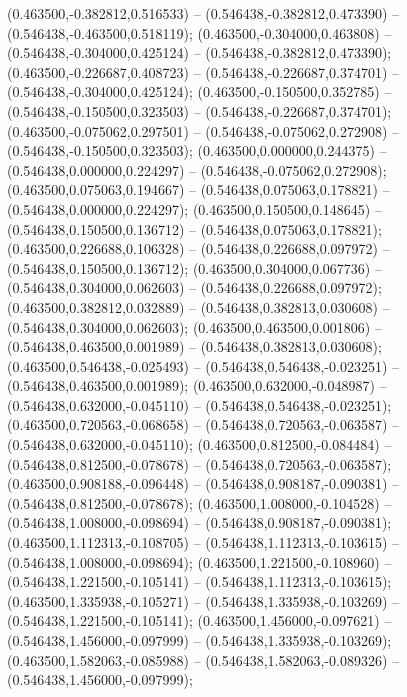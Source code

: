  (0.463500,-0.382812,0.516533) -- (0.546438,-0.382812,0.473390) -- (0.546438,-0.463500,0.518119);
 (0.463500,-0.304000,0.463808) -- (0.546438,-0.304000,0.425124) -- (0.546438,-0.382812,0.473390);
 (0.463500,-0.226687,0.408723) -- (0.546438,-0.226687,0.374701) -- (0.546438,-0.304000,0.425124);
 (0.463500,-0.150500,0.352785) -- (0.546438,-0.150500,0.323503) -- (0.546438,-0.226687,0.374701);
 (0.463500,-0.075062,0.297501) -- (0.546438,-0.075062,0.272908) -- (0.546438,-0.150500,0.323503);
 (0.463500,0.000000,0.244375) -- (0.546438,0.000000,0.224297) -- (0.546438,-0.075062,0.272908);
 (0.463500,0.075063,0.194667) -- (0.546438,0.075063,0.178821) -- (0.546438,0.000000,0.224297);
 (0.463500,0.150500,0.148645) -- (0.546438,0.150500,0.136712) -- (0.546438,0.075063,0.178821);
 (0.463500,0.226688,0.106328) -- (0.546438,0.226688,0.097972) -- (0.546438,0.150500,0.136712);
 (0.463500,0.304000,0.067736) -- (0.546438,0.304000,0.062603) -- (0.546438,0.226688,0.097972);
 (0.463500,0.382812,0.032889) -- (0.546438,0.382813,0.030608) -- (0.546438,0.304000,0.062603);
 (0.463500,0.463500,0.001806) -- (0.546438,0.463500,0.001989) -- (0.546438,0.382813,0.030608);
 (0.463500,0.546438,-0.025493) -- (0.546438,0.546438,-0.023251) -- (0.546438,0.463500,0.001989);
 (0.463500,0.632000,-0.048987) -- (0.546438,0.632000,-0.045110) -- (0.546438,0.546438,-0.023251);
 (0.463500,0.720563,-0.068658) -- (0.546438,0.720563,-0.063587) -- (0.546438,0.632000,-0.045110);
 (0.463500,0.812500,-0.084484) -- (0.546438,0.812500,-0.078678) -- (0.546438,0.720563,-0.063587);
 (0.463500,0.908188,-0.096448) -- (0.546438,0.908187,-0.090381) -- (0.546438,0.812500,-0.078678);
 (0.463500,1.008000,-0.104528) -- (0.546438,1.008000,-0.098694) -- (0.546438,0.908187,-0.090381);
 (0.463500,1.112313,-0.108705) -- (0.546438,1.112313,-0.103615) -- (0.546438,1.008000,-0.098694);
 (0.463500,1.221500,-0.108960) -- (0.546438,1.221500,-0.105141) -- (0.546438,1.112313,-0.103615);
 (0.463500,1.335938,-0.105271) -- (0.546438,1.335938,-0.103269) -- (0.546438,1.221500,-0.105141);
 (0.463500,1.456000,-0.097621) -- (0.546438,1.456000,-0.097999) -- (0.546438,1.335938,-0.103269);
 (0.463500,1.582063,-0.085988) -- (0.546438,1.582063,-0.089326) -- (0.546438,1.456000,-0.097999);
